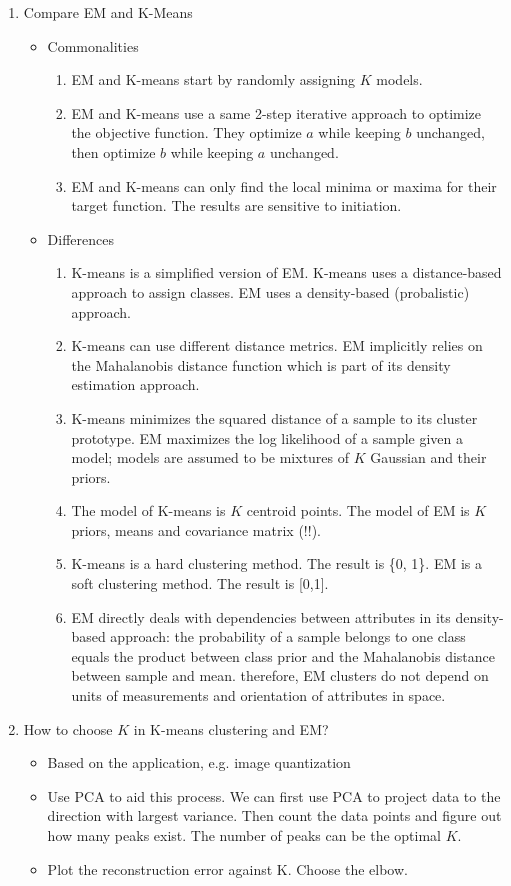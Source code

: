 \documentclass{article}
\begin{document}
\begin{enumerate}
\item Compare EM and K-Means
\begin{itemize}
\item Commonalities
    \begin{enumerate}
        \item EM and K-means start by randomly assigning $K$ models. 
        \item EM and K-means use a same 2-step iterative approach to optimize the objective function. They optimize $a$ while keeping $b$ unchanged, then optimize $b$ while keeping $a$ unchanged.
        \item EM and K-means can only find the local minima or maxima for their target function. The results are sensitive to initiation.
    \end{enumerate}
\item Differences
\begin{enumerate}
    \item K-means is a simplified version of EM. K-means uses a distance-based approach to assign classes. EM uses a density-based (probalistic) approach.
    \item K-means can use different distance metrics. EM implicitly relies on the Mahalanobis distance function which is part of its density estimation approach.
    \item K-means minimizes the squared distance of a sample to its cluster prototype. EM maximizes the log likelihood of a sample given a model; models are assumed to be mixtures of $K$ Gaussian and their priors.
    \item The model of K-means is $K$ centroid points. The model of EM is $K$ priors, means and covariance matrix (!!).
    \item K-means is a hard clustering method. The result is \{0, 1\}. EM is a soft clustering method. The result is [0,1].
    \item EM directly deals with dependencies between attributes in its density-based approach: the probability of a sample belongs to one class equals the product between class prior and the Mahalanobis distance between sample and mean. therefore, EM clusters do not depend on units of measurements and orientation of attributes in space.
\end{enumerate}
\end{itemize}

\item How to choose $K$ in K-means clustering and EM?
\begin{itemize}
    \item Based on the application, e.g. image quantization
    \item Use PCA to aid this process. We can first use PCA to project data to the direction with largest variance. Then count the data points and figure out how many peaks exist. The number of peaks can be the optimal $K$.
    \item Plot the reconstruction error against K. Choose the elbow.
\end{itemize}

\end{enumerate}
\end{document}
